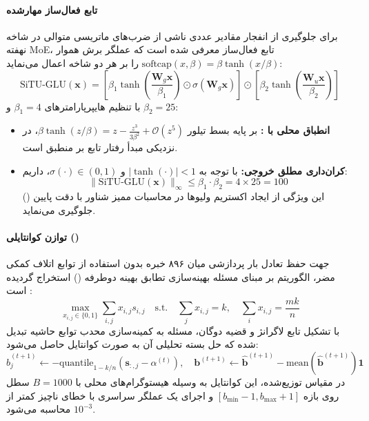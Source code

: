 \paragraph*{تابع فعال‌ساز مهارشده }
برای جلوگیری از انفجار مقادیر عددی ناشی از ضرب‌های ماتریسی متوالی در شاخه نهفته MoE، تابع فعال‌ساز  معرفی شده است که عملگر برش هموار $\text{softcap}(x, \beta) = \beta \tanh(x/\beta)$ را بر هر دو شاخه اعمال می‌نماید:
\begin{equation}
    \text{SiTU-GLU}(\mathbf{x}) = \left[ \beta_1 \tanh\left(\frac{\mathbf{W}_g \mathbf{x}}{\beta_1}\right) \odot \sigma\left(\mathbf{W}_g \mathbf{x}\right) \right] \odot \left[ \beta_2 \tanh\left(\frac{\mathbf{W}_u \mathbf{x}}{\beta_2}\right) \right]
\end{equation}
با تنظیم هایپرپارامترهای $\beta_1 = 4$ و $\beta_2 = 25$:
\begin{itemize}
    \item \textbf{انطباق محلی با :} بر پایه بسط تیلور $\beta \tanh(z/\beta) = z - \frac{z^3}{3\beta^2} + \mathcal{O}(z^5)$، در نزدیکی مبدأ رفتار تابع بر  \cite{shazeer2020glu} منطبق است.
    \item \textbf{کران‌داری مطلق خروجی:} با توجه به $|\tanh(\cdot)| < 1$ و $\sigma(\cdot) \in (0, 1)$، داریم:
    \begin{equation}
        \|\text{SiTU-GLU}(\mathbf{x})\|_\infty \le \beta_1 \cdot \beta_2 = 4 \times 25 = 100
    \end{equation}
    این ویژگی از ایجاد اکستریم ولیوها در محاسبات ممیز شناور با دقت پایین () جلوگیری می‌نماید.
\end{itemize}

\paragraph*{توازن کوانتایلی ()}
جهت حفظ تعادل بار پردازشی میان ۸۹۶ خبره بدون استفاده از توابع اتلاف کمکی مضر، الگوریتم  بر مبنای مسئله بهینه‌سازی تطابق بهینه دوطرفه () استخراج گردیده است \cite{su2026travelsmoe}:
\begin{equation}
    \max_{x_{i,j} \in \{0, 1\}} \sum_{i,j} x_{i,j} s_{i,j} \quad \text{s.t.} \quad \sum_j x_{i,j} = k, \quad \sum_i x_{i,j} = \frac{mk}{n}
\end{equation}
با تشکیل تابع لاگرانژ و قضیه دوگان، مسئله به کمینه‌سازی محدب توابع حاشیه تبدیل شده که حل بسته تحلیلی آن به صورت کوانتایل حاصل می‌شود:
\begin{equation}
    \hat{b}_j^{(t+1)} \leftarrow -\text{quantile}_{1 - k/n}\left(\mathbf{s}_{:, j} - \alpha^{(t)}\right), \quad \mathbf{b}^{(t+1)} \leftarrow \hat{\mathbf{b}}^{(t+1)} - \text{mean}\left(\hat{\mathbf{b}}^{(t+1)}\right)\mathbf{1}
\end{equation}
در مقیاس توزیع‌شده، این کوانتایل به وسیله هیستوگرام‌های محلی با $B=1000$ سطل روی بازه $[b_{\min}-1, b_{\max}+1]$ و اجرای یک عملگر سراسری  با خطای ناچیز کمتر از $10^{-3}$ محاسبه می‌شود.

